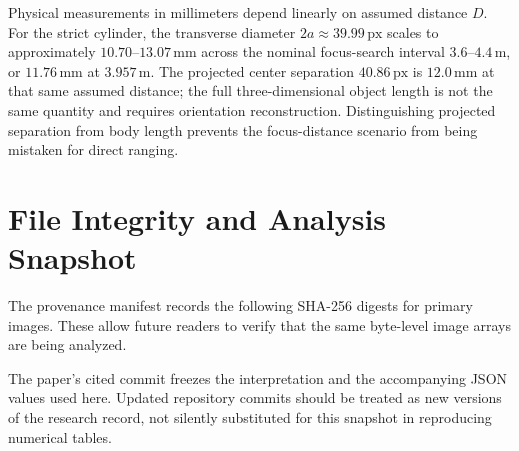 \documentclass[11pt,letterpaper]{article}
\newcommand{\px}{\,\mathrm{px}}
\begin{document}
Physical measurements in millimeters depend linearly on assumed distance \(D\). For the strict cylinder, the transverse diameter \(2a\approx39.99\px\) scales to approximately \(10.70\)--\(13.07\,\mathrm{mm}\) across the nominal focus-search interval \(3.6\)--\(4.4\,\mathrm m\), or \(11.76\,\mathrm{mm}\) at \(3.957\,\mathrm m\). The projected center separation \(40.86\px\) is \(12.0\,\mathrm{mm}\) at that same assumed distance; the full three-dimensional object length is not the same quantity and requires orientation reconstruction. Distinguishing projected separation from body length prevents the focus-distance scenario from being mistaken for direct ranging.

\section{File Integrity and Analysis Snapshot}
\label{app:hash}

The provenance manifest records the following SHA-256 digests for primary images. These allow future readers to verify that the same byte-level image arrays are being analyzed.


\medskip
\noindent The paper's cited commit freezes the interpretation and the accompanying JSON values used here. Updated repository commits should be treated as new versions of the research record, not silently substituted for this snapshot in reproducing numerical tables.
\end{document}
